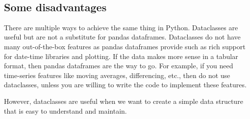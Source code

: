 \documentclass[11pt]{article}
\begin{document}
    \begin{center}
    \end{center}
    { \hspace*{\fill} \\}
    
    \hypertarget{some-disadvantages}{%
\subsection{Some disadvantages}\label{some-disadvantages}}

There are multiple ways to achieve the same thing in Python. Dataclasses
are useful but are not a substitute for pandas dataframes. Dataclasses
do not have many out-of-the-box features as pandas dataframes provide
such as rich support for date-time libraries and plotting. If the data
makes more sense in a tabular format, then pandas dataframes are the way
to go. For example, if you need time-series features like moving
averages, differencing, etc., then do not use dataclasses, unless you
are willing to write the code to implement these features.

However, dataclasses are useful when we want to create a simple data
structure that is easy to understand and maintain.

    


    
    
    
\end{document}
